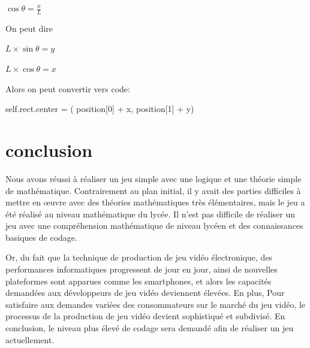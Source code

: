 \documentclass{article}
\begin{document}
$\cos\theta = \frac{x}{L}$


On peut dire


$L\times\sin\theta = y$


$L\times\cos\theta = x$


Alors on peut convertir vers code:


self.rect.center = ( position[0] + x, position[1] + y)
\newpage

\section{conclusion}
Nous avons réussi à réaliser un jeu simple avec une logique et une théorie simple de mathématique. Contrairement au plan initial, il y avait des parties difficiles à mettre en œuvre avec des théories mathématiques très élémentaires, mais le jeu a été réalisé au niveau mathématique du lycée. Il n’est pas difficile de réaliser un jeu avec une compréhension mathématique de niveau lycéen et des connaissances basiques de codage. 


Or, du fait que la technique de production de jeu vidéo électronique, des performances informatiques progressent de jour en jour, ainsi de nouvelles plateformes sont apparues comme les smartphones, et alors les capacités demandées aux développeurs de jeu vidéo deviennent élevées. En plus, Pour satisfaire aux demandes variées des consommateurs sur le marché du jeu vidéo, le processus de la production de jeu vidéo devient sophistiqué et subdivisé.  En conclusion, le niveau plus élevé de codage sera demandé afin de réaliser un jeu actuellement. 
\end{document}
